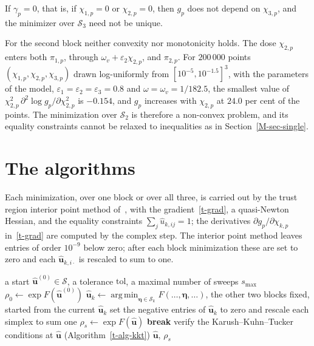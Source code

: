 \documentclass[11pt]{article}
\theoremstyle{plain}
\theoremstyle{remark}
\numberwithin{equation}{section}
\begin{document}
If $\gamma_p=0$, that is, if $\chi_{1,p}=0$ or $\chi_{2,p}=0$, then $g_p$ does not
depend on $\chi_{3,p}$, and the minimizer over $\mathcal{S}_3$ need not be unique.

For the second block neither convexity nor monotonicity holds. The dose $\chi_{2,p}$
enters both $\pi_{1,p}$, through $\omega_v+\varepsilon_2\chi_{2,p}$, and
$\pi_{2,p}$. For $200\,000$ points $(\chi_{1,p},\chi_{2,p},\chi_{3,p})$ drawn
log-uniformly from $\left[10^{-5},10^{-1.5}\right]^3$, with the parameters of
the model, $\varepsilon_1=\varepsilon_2=\varepsilon_3=0.8$ and
$\omega=\omega_v=1/182.5$, the smallest value of
$\chi_{2,p}^2\,\partial^2\log g_p/\partial \chi_{2,p}^2$ is $-0.154$, and $g_p$
increases with $\chi_{2,p}$ at $24.0$ per cent of the points. The minimization
over $\mathcal{S}_2$ is therefore a non-convex problem, and its equality
constraints cannot be relaxed to inequalities as in Section~\ref{M-sec-single}.

\section{The algorithms}\label{t-algorithm}

Each minimization, over one block or over all three, is carried out by the
trust region interior point method of~\cite{1999Byrd_Hribar_Nocedal}, with the
gradient~\eqref{t-grad}, a quasi-Newton Hessian, and the equality constraints
$\sum_j\widehat u_{k,ij}=1$; the derivatives $\partial g_p/\partial \chi_{k,p}$
in~\eqref{t-grad} are computed by the complex step. The interior point method
leaves entries of order $10^{-9}$ below zero; after each block minimization
these are set to zero and each $\widehat{\bm u}_{k,i\cdot}$ is rescaled to sum
to one.

\begin{algorithm}[ht]
\caption{Block Gauss--Seidel over the dose types}\label{t-alg-gs}
\begin{algorithmic}[1]
\Require a start $\widehat{\bm u}^{(0)}\in\mathcal{S}$, a tolerance
$\mathrm{tol}$, a maximal number of sweeps $s_{\max}$
\State $\rho_0\gets\exp F\left(\widehat{\bm u}^{(0)}\right)$
    \State $\widehat{\bm u}_k\gets\operatorname*{arg\,min}_{\bm\eta\in\mathcal{S}_k}
    F(\ldots,\bm\eta,\ldots)$, the other two blocks fixed, started from the current $\widehat{\bm u}_k$
    \State set the negative entries of $\widehat{\bm u}_k$ to zero and rescale each simplex to sum one
  \EndFor
  \State $\rho_s\gets\exp F\left(\widehat{\bm u}\right)$
    \State \textbf{break}
  \EndIf
\EndFor
\State verify the Karush--Kuhn--Tucker conditions at $\widehat{\bm u}$ (Algorithm~\ref{t-alg-kkt})
\State \Return $\widehat{\bm u}$, $\rho_s$
\end{algorithmic}
\end{algorithm}
\end{document}
